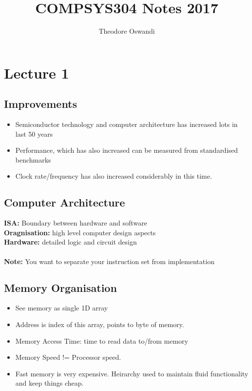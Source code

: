 \documentclass{article}
\title{COMPSYS304 Notes 2017}
\author{Theodore Oswandi}
\newcommand\tab[1][0.5cm]{\hspace*{#1}}
\begin{document}
 \maketitle{} 

\section{Lecture 1}
	\subsection{Improvements}
		\begin{itemize}
			\item Semiconductor technology and computer architecture has increased lots in last 50 years
			\item Performance, which has also increased can be measured from standardised benchmarks
			\item Clock rate/frequency has also increased considerably in this time.
		\end{itemize}

	\subsection{Computer Architecture}
		\textbf{\tab ISA:} Boundary between hardware and software\\
		\textbf{\tab Oragnisation:} high level computer design aspects\\
		\textbf{\tab Hardware:} detailed logic and circuit design
		\\ \\
		\textbf{\tab Note:} You want to separate your instruction set from implementation

	\subsection{Memory Organisation}
		\begin{itemize}
			\item See memory as single 1D array
			\item Address is index of this array, points to byte of memory.
			\item Memory Access Time: time to read data to/from memory \\ 
			\item Memory Speed != Processor speed.
			\item Fast memory is very expensive. Heirarchy used to maintain fluid functionality and keep things cheap.
		\end{itemize}
\end{document}
